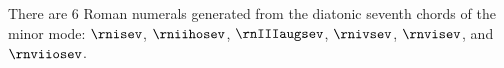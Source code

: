 
There are 6 Roman numerals generated from the diatonic
seventh chords of the minor mode: $\rnisev$, $\rniihosev$,
$\rnIIIaugsev$, $\rnivsev$, $\rnvisev$, and $\rnviiosev$.
